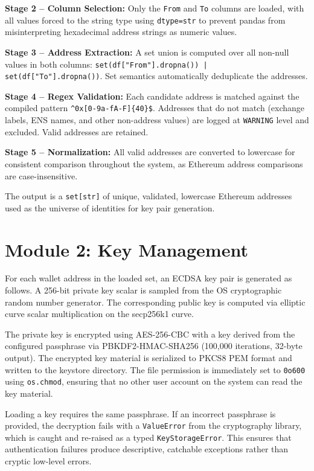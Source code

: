 \documentclass[12pt,a4paper]{report}
\begin{document}
\textbf{Stage 2 -- Column Selection:} Only the \texttt{From} and \texttt{To} columns are
loaded, with all values forced to the string type using \texttt{dtype=str} to prevent
pandas from misinterpreting hexadecimal address strings as numeric values.

\textbf{Stage 3 -- Address Extraction:} A set union is computed over all non-null values
in both columns: \texttt{set(df["From"].dropna()) | set(df["To"].dropna())}. Set semantics
automatically deduplicate the addresses.

\textbf{Stage 4 -- Regex Validation:} Each candidate address is matched against the
compiled pattern \texttt{\^{}0x[0-9a-fA-F]\{40\}\$}. Addresses that do not match
(exchange labels, ENS names, and other non-address values) are logged at \texttt{WARNING}
level and excluded. Valid addresses are retained.

\textbf{Stage 5 -- Normalization:} All valid addresses are converted to lowercase for
consistent comparison throughout the system, as Ethereum address comparisons are
case-insensitive.

The output is a \texttt{set[str]} of unique, validated, lowercase Ethereum addresses used
as the universe of identities for key pair generation.

\section{Module 2: Key Management}

For each wallet address in the loaded set, an ECDSA key pair is generated as follows.
A 256-bit private key scalar is sampled from the OS cryptographic random number generator.
The corresponding public key is computed via elliptic curve scalar multiplication on the
secp256k1 curve.

The private key is encrypted using AES-256-CBC with a key derived from the configured
passphrase via PBKDF2-HMAC-SHA256 (100,000 iterations, 32-byte output). The encrypted
key material is serialized to PKCS8 PEM format and written to the keystore directory.
The file permission is immediately set to \texttt{0o600} using \texttt{os.chmod}, ensuring
that no other user account on the system can read the key material.

Loading a key requires the same passphrase. If an incorrect passphrase is provided, the
decryption fails with a \texttt{ValueError} from the cryptography library, which is caught
and re-raised as a typed \texttt{KeyStorageError}. This ensures that authentication
failures produce descriptive, catchable exceptions rather than cryptic low-level errors.
\end{document}
